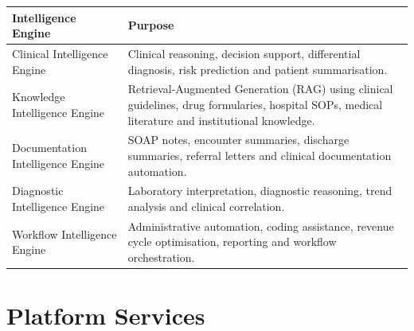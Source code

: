 \begin{center}

\begin{tabularx}{\textwidth}{|Y|Y|}

\hline


\textbf{Intelligence Engine} &

\textbf{Purpose} \\

\hline

Clinical Intelligence Engine &

Clinical reasoning, decision support, differential diagnosis, risk prediction and patient summarisation. \\

\hline

Knowledge Intelligence Engine &

Retrieval-Augmented Generation (RAG) using clinical guidelines, drug formularies, hospital SOPs, medical literature and institutional knowledge. \\

\hline

Documentation Intelligence Engine &

SOAP notes, encounter summaries, discharge summaries, referral letters and clinical documentation automation. \\

\hline

Diagnostic Intelligence Engine &

Laboratory interpretation, diagnostic reasoning, trend analysis and clinical correlation. \\

\hline

Workflow Intelligence Engine &

Administrative automation, coding assistance, revenue cycle optimisation, reporting and workflow orchestration. \\

\hline

\end{tabularx}

\end{center}


\section{Platform Services}

